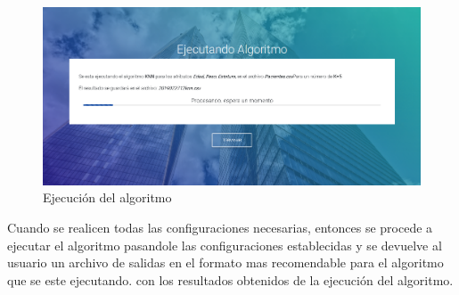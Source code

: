 \\
\begin{figure}[H]
	\hypertarget{fig:red}{\hspace{1pt}}
	\begin{center}
		\includegraphics[width=.9\textwidth]{capitulo7/images/ejecutar.png}
		\caption{Ejecución del algoritmo}
		\label{fig:pond}
	\end{center}
\end{figure}
Cuando se realicen todas las configuraciones necesarias, entonces se procede a ejecutar el algoritmo pasandole las configuraciones establecidas y se devuelve al usuario un archivo de salidas en el formato mas recomendable para el algoritmo que se este ejecutando. con los resultados obtenidos de la ejecución del algoritmo.






